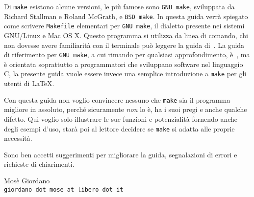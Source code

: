 Di \texttt{make} esistono alcune versioni, le più famose sono \texttt{GNU make},
sviluppata da Richard Stallman e Roland McGrath, e \texttt{BSD make}.  In questa
guida verrà spiegato come scrivere \texttt{Makefile} elementari per
\texttt{GNU make}, il dialetto presente nei sistemi GNU/Linux e Mac OS X.
Questo programma si utilizza da linea di comando, chi non dovesse avere
familiarità con il terminale può leggere la guida di~\cite{giacomelli:console}.
La guida di riferimento per \texttt{GNU make}, a cui rimando per qualsiasi
approfondimento, è~\cite{gnu:make}, ma è orientata soprattutto a programmatori
che sviluppano software nel linguaggio C, la presente guida vuole essere invece
una semplice introduzione a \texttt{make} per gli utenti di \LaTeX{}.

Con questa guida non voglio convincere nessuno che \texttt{make} sia il
programma migliore in assoluto, perché sicuramente \emph{non} lo è, ha i suoi
pregi e anche qualche difetto.  Qui voglio solo illustrare le sue funzioni e
potenzialità fornendo anche degli esempi d'uso, starà poi al lettore decidere se
\texttt{make} si adatta alle proprie necessità.

Sono ben accetti suggerimenti per migliorare la guida, segnalazioni di errori e
richieste di chiarimenti.

\begin{flushright}
\begin{minipage}{0.6\textwidth}\centering
Mosè Giordano \\
\texttt{giordano dot mose at libero dot it}
\end{minipage}
\end{flushright}

